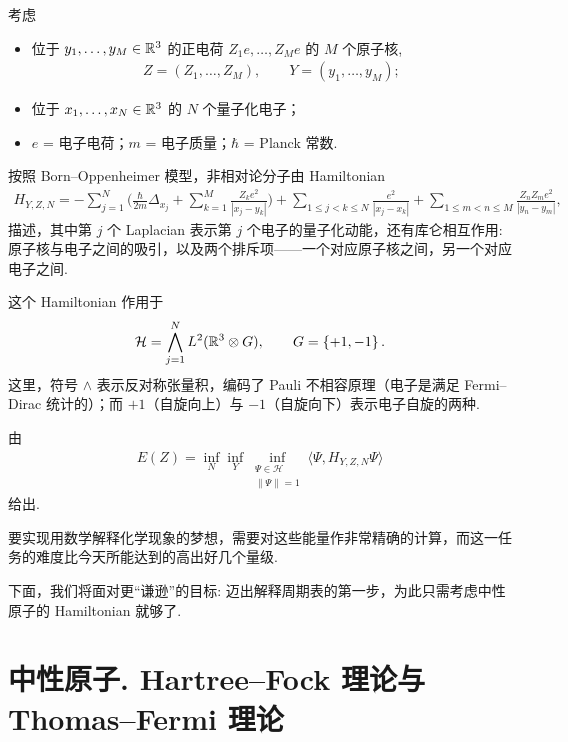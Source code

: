 考虑
\begin{itemize}
\item 位于 $y_1, \ldots, y_M \in \mathbb{R}^3$ 的正电荷 $Z_1e, \ldots, Z_Me$ 的 $M$ 个原子核,
\begin{align*}
  Z=(Z_{1},\ldots,Z_{M}),\qquad Y=(y_{1},\ldots,y_{M});
\end{align*}
\item 位于 $x_1, \ldots, x_N \in \mathbb{R}^3$ 的 $N$ 个量子化电子；
\item $e$ = 电子电荷；$m$ = 电子质量；$\hbar$ = Planck 常数.
\end{itemize}
按照 Born--Oppenheimer 模型，非相对论分子由 Hamiltonian
\begin{align*}
  H_{Y,Z,N}=-\sum_{j=1}^{N}\Big(\frac{\hbar}{2m}\Delta_{x_{j}}+\sum_{k=1}^{M}\frac{Z_{k}e^{2}}{\left|x_{j}-y_{k}\right|}\Big)
  +\sum_{1\leq j<k\leq N}\frac{e^{2}}{\left|x_{j}-x_{k}\right|}
  +\sum_{1\leq m<n\leq M}\frac{Z_{n}Z_{m}e^{2}}{\left|y_{n}-y_{m}\right|},
\end{align*}
描述，其中第 $j$ 个 Laplacian 表示第 $j$ 个电子的量子化动能，还有库仑相互作用: 原子核与电子之间的吸引，以及两个排斥项——一个对应原子核之间，另一个对应电子之间.

这个 Hamiltonian 作用于
\begin{align*}
  \mathcal{H}=\bigwedge_{j=1}^{N}L^{2}(\mathbb{R}^{3}\otimes G),\qquad G=\left\{+1,-1\right\}.
\end{align*}
这里，符号 $\wedge$ 表示反对称张量积，编码了 Pauli 不相容原理（电子是满足 Fermi--Dirac 统计的）；而 $+1$（自旋向上）与 $-1$（自旋向下）表示电子自旋的两种.

由
\begin{align*}
  E(Z)=\inf_{N}\inf_{Y}\inf_{\substack{\Psi\in\mathcal{H}\\ \|\Psi\|=1}}\langle\Psi,H_{Y,Z,N}\Psi\rangle
\end{align*}
给出.

要实现用数学解释化学现象的梦想，需要对这些能量作非常精确的计算，而这一任务的难度比今天所能达到的高出好几个量级.

下面，我们将面对更``谦逊''的目标: 迈出解释周期表的第一步，为此只需考虑中性原子的 Hamiltonian 就够了.

\section{中性原子. Hartree--Fock 理论与 Thomas--Fermi 理论}

